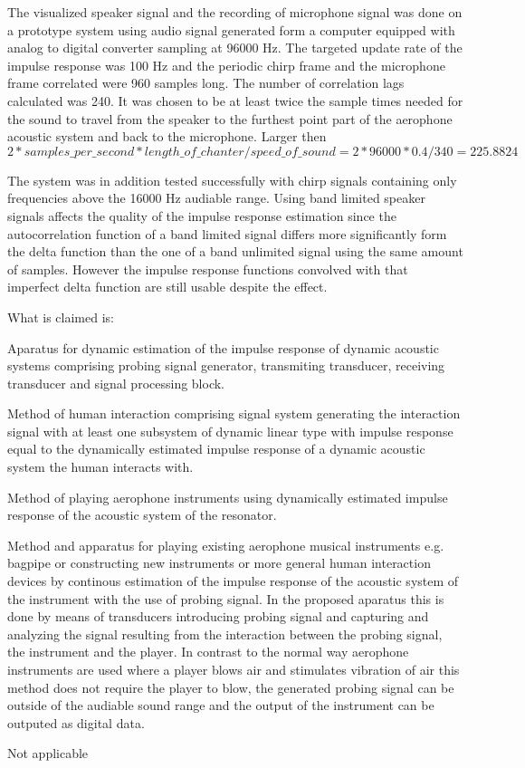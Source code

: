 \pa
The visualized speaker signal and the recording of microphone signal was done on a prototype system using audio signal generated form a computer equipped with analog to digital converter sampling at 96000 Hz. The targeted update rate of the impulse response was 100 Hz and the periodic chirp frame and the microphone frame correlated were 960 samples long. The number of correlation lags calculated was 240. It was chosen to be at least twice the sample times needed for the sound to travel from the speaker to the furthest point part of the aerophone acoustic system and back to the microphone. Larger then $2*samples\_per\_second*length\_of\_chanter/speed\_of\_sound = 2*96000*0.4/340 = 225.8824$

\pa
The system was in addition tested successfully with chirp signals containing only frequencies above the 16000 Hz audiable range. Using band limited speaker signals affects the quality of the impulse response estimation since the autocorrelation function of a band limited signal differs more significantly form the delta function than the one of a band unlimited signal using the same amount of samples. However the impulse response functions convolved with that imperfect delta function are still usable despite the effect.

\newpage
{}
\vspace*{12pt}
\begin{center}
\vspace{12pt}
What is claimed is:
\vspace{12pt}
\end{center}

\cl Aparatus for dynamic estimation of the impulse response of dynamic acoustic systems comprising probing signal generator, transmiting transducer, receiving transducer and signal processing block.

\cl Method of human interaction comprising signal system generating the interaction signal with at least one subsystem of dynamic linear type with impulse response equal to the dynamically estimated impulse response of a dynamic acoustic system the human interacts with.

\cl Method of playing aerophone instruments using dynamically estimated impulse response of the acoustic system of the resonator.

\newpage


\pa
Method and apparatus for playing existing aerophone musical instruments
e.g. bagpipe or constructing new instruments or more general
human interaction devices by continous estimation of the impulse
response of the acoustic system of the instrument with the use of probing
signal. In the proposed aparatus this is done by means of transducers
introducing probing signal and capturing and analyzing the signal resulting from the
interaction between the probing signal, the instrument and the player. In
contrast to the normal way aerophone instruments are used where a player
blows air and stimulates vibration of air this method does not require
the player to blow, the generated probing signal can be outside of the
audiable sound range and the output of the instrument can be outputed as
digital data.

\newpage

Not applicable



